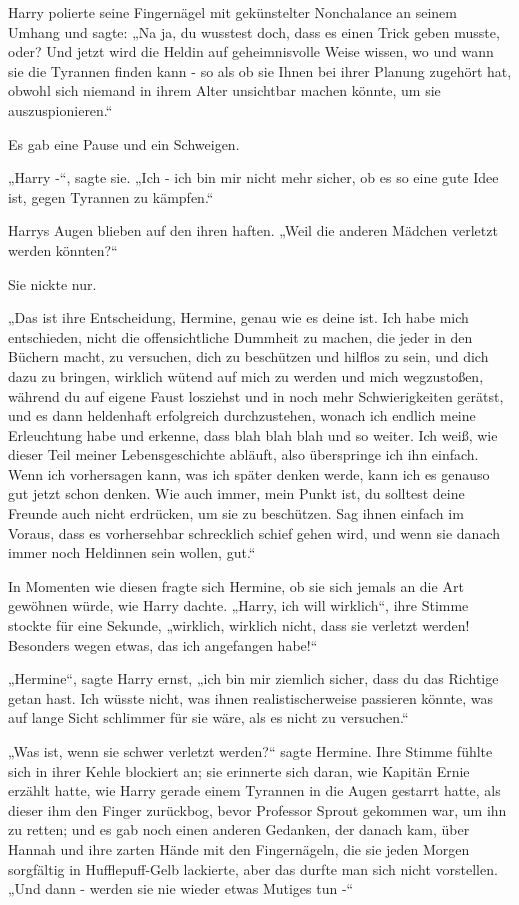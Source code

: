 {Harry polierte seine Fingernägel mit gekünstelter Nonchalance an seinem Umhang und sagte: „Na ja, du wusstest doch, dass es einen Trick geben musste, oder? Und jetzt wird die Heldin auf geheimnisvolle Weise wissen, wo und wann sie die Tyrannen finden kann - so als ob sie Ihnen bei ihrer Planung zugehört hat, obwohl sich niemand in ihrem Alter unsichtbar machen könnte, um sie auszuspionieren.“

Es gab eine Pause und ein Schweigen.

„Harry -“, sagte sie. „Ich - ich bin mir nicht mehr sicher, ob es so eine gute Idee ist, gegen Tyrannen zu kämpfen.“

Harrys Augen blieben auf den ihren haften. „Weil die anderen Mädchen verletzt werden könnten?“

Sie nickte nur.

„Das ist ihre Entscheidung, Hermine, genau wie es deine ist. Ich habe mich entschieden, nicht die offensichtliche Dummheit zu machen, die jeder in den Büchern macht, zu versuchen, dich zu beschützen und hilflos zu sein, und dich dazu zu bringen, wirklich wütend auf mich zu werden und mich wegzustoßen, während du auf eigene Faust losziehst und in noch mehr Schwierigkeiten gerätst, und es dann heldenhaft erfolgreich durchzustehen, wonach ich endlich meine Erleuchtung habe und erkenne, dass blah blah blah und so weiter. Ich weiß, wie dieser Teil meiner Lebensgeschichte abläuft, also überspringe ich ihn einfach. Wenn ich vorhersagen kann, was ich später denken werde, kann ich es genauso gut jetzt schon denken. Wie auch immer, mein Punkt ist, du solltest deine Freunde auch nicht erdrücken, um sie zu beschützen. Sag ihnen einfach im Voraus, dass es vorhersehbar schrecklich schief gehen wird, und wenn sie danach immer noch Heldinnen sein wollen, gut.“

In Momenten wie diesen fragte sich Hermine, ob sie sich jemals an die Art gewöhnen würde, wie Harry dachte. „Harry, ich will wirklich“, ihre Stimme stockte für eine Sekunde, „wirklich, wirklich nicht, dass sie verletzt werden! Besonders wegen etwas, das ich angefangen habe!“

„Hermine“, sagte Harry ernst, „ich bin mir ziemlich sicher, dass du das Richtige getan hast. Ich wüsste nicht, was ihnen realistischerweise passieren könnte, was auf lange Sicht schlimmer für sie wäre, als es nicht zu versuchen.“

„Was ist, wenn sie schwer verletzt werden?“ sagte Hermine. Ihre Stimme fühlte sich in ihrer Kehle blockiert an; sie erinnerte sich daran, wie Kapitän Ernie erzählt hatte, wie Harry gerade einem Tyrannen in die Augen gestarrt hatte, als dieser ihm den Finger zurückbog, bevor Professor Sprout gekommen war, um ihn zu retten; und es gab noch einen anderen Gedanken, der danach kam, über Hannah und ihre zarten Hände mit den Fingernägeln, die sie jeden Morgen sorgfältig in Hufflepuff-Gelb lackierte, aber das durfte man sich nicht vorstellen. „Und dann - werden sie nie wieder etwas Mutiges tun -“

}

